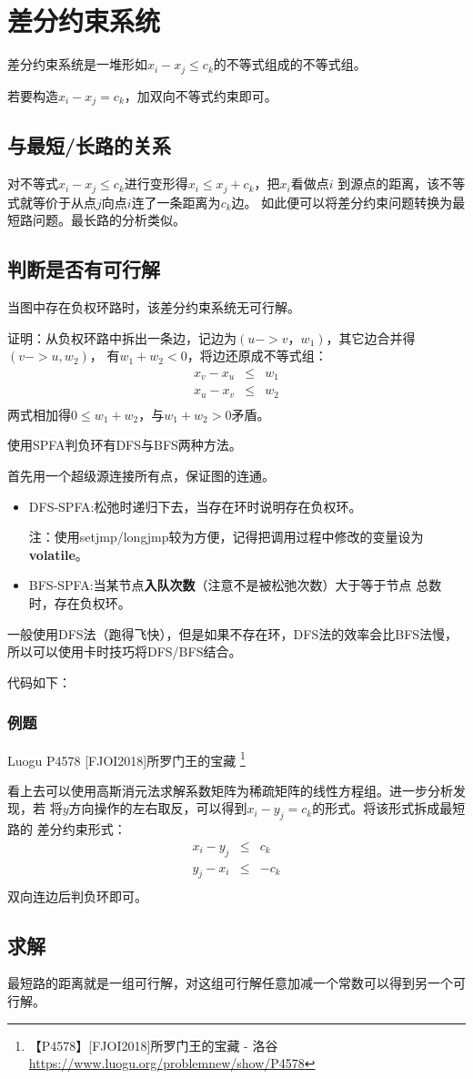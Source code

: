 \section{差分约束系统}
差分约束系统是一堆形如$x_i-x_j\leq c_k$的不等式组成的不等式组。

若要构造$x_i-x_j=c_k$，加双向不等式约束即可。

\subsection{与最短/长路的关系}
对不等式$x_i-x_j\leq c_k$进行变形得$x_i\leq x_j+c_k$，把$x_i$看做点$i$
到源点的距离，该不等式就等价于从点$j$向点$i$连了一条距离为$c_k$边。
如此便可以将差分约束问题转换为最短路问题。最长路的分析类似。

\subsection{判断是否有可行解}

\begin{theorem}
    当图中存在负权环路时，该差分约束系统无可行解。
\end{theorem}

证明：从负权环路中拆出一条边，记边为$(u->v，w_1)$，其它边合并得$(v->u,w_2)$，
有$w_1+w_2<0$，将边还原成不等式组：
\begin{eqnarray*}
    x_v-x_u&\leq& w_1\\
    x_u-x_v&\leq& w_2\\
\end{eqnarray*}
两式相加得$0\leq w_1+w_2$，与$w_1+w_2>0$矛盾。

使用SPFA判负环有DFS与BFS两种方法。

首先用一个超级源连接所有点，保证图的连通。

\begin{itemize}
    \item DFS-SPFA:松弛时递归下去，当存在环时说明存在负权环。

    注：使用setjmp/longjmp较为方便，记得把调用过程中修改的变量设为
    {\bfseries volatile}。
    \item BFS-SPFA:当某节点{\bfseries 入队次数}（注意不是被松弛次数）大于等于节点
    总数时，存在负权环。
\end{itemize}
一般使用DFS法（跑得飞快），但是如果不存在环，DFS法的效率会比BFS法慢，
所以可以使用卡时技巧将DFS/BFS结合。

代码如下：


\subsubsection{例题}
Luogu P4578 [FJOI2018]所罗门王的宝藏
\footnote{【P4578】[FJOI2018]所罗门王的宝藏 - 洛谷
\url{https://www.luogu.org/problemnew/show/P4578}}

看上去可以使用高斯消元法求解系数矩阵为稀疏矩阵的线性方程组。进一步分析发现，若
将$y$方向操作的左右取反，可以得到$x_i-y_j=c_k$的形式。将该形式拆成最短路的
差分约束形式：
\begin{eqnarray*}
    x_i-y_j&\leq& c_k\\
    y_j-x_i&\leq& -c_k\\
\end{eqnarray*}
双向连边后判负环即可。

\subsection{求解}
最短路的距离就是一组可行解，对这组可行解任意加减一个常数可以得到另一个可行解。
